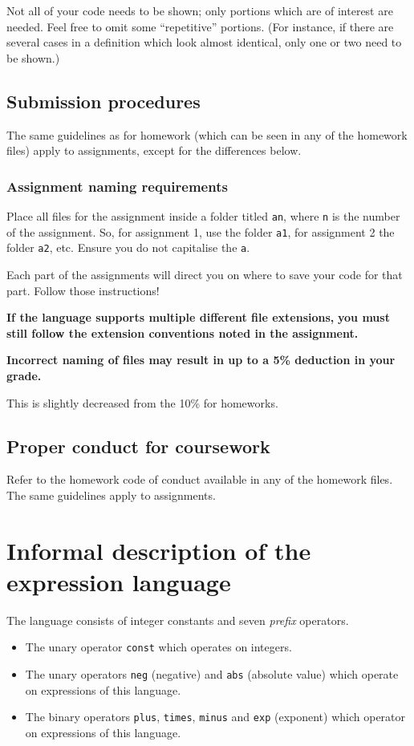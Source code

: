 \documentclass[11pt]{article}
\begin{document}
Not all of your code needs to be shown;
only portions which are of interest are needed.
Feel free to omit some “repetitive” portions.
(For instance, if there are several cases in a definition
which look almost identical, only one or two need to be shown.)

\subsection*{Submission procedures}
\label{sec:org7fb0f4d}
The same guidelines as for homework
(which can be seen in any of the homework files)
apply to assignments, except for the differences below.

\subsubsection*{Assignment naming requirements}
\label{sec:org7fd1eff}

Place all files for the assignment
inside a folder titled \texttt{an}, where \texttt{n} is the number of the assignment.
So, for assignment 1, use the folder \texttt{a1}, for assignment 2 the folder \texttt{a2}, etc.
Ensure you do not capitalise the \texttt{a}.

Each part of the assignments will direct you on where to
save your code for that part. Follow those instructions!

\begin{center}
\textbf{If the language supports multiple different file extensions,}
\textbf{you must still follow the extension conventions noted in the assignment.}
\end{center}

\begin{center}
\textbf{Incorrect naming of files may result in up to a 5\% deduction in your grade.}
\end{center}
This is slightly decreased from the 10\% for homeworks.

\subsection*{Proper conduct for coursework}
\label{sec:orgfc67068}
Refer to the homework code of conduct available in any of the homework files.
The same guidelines apply to assignments.

\section*{Informal description of the expression language}
\label{sec:orge7d5c98}
The language consists of integer constants and seven \emph{prefix} operators.
\begin{itemize}
\item The unary operator \texttt{const} which operates on integers.
\item The unary operators \texttt{neg} (negative) and \texttt{abs} (absolute value)
which operate on expressions of this language.
\item The binary operators \texttt{plus}, \texttt{times}, \texttt{minus} and \texttt{exp} (exponent)
which operator on expressions of this language.
\end{itemize}
\end{document}

